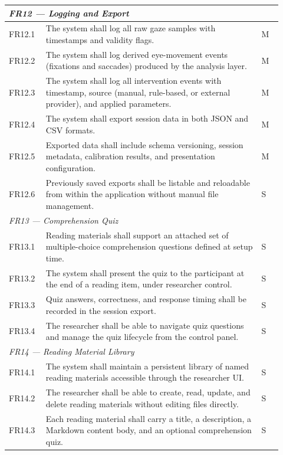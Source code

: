 \begin{longtable}{%
  p{0.12\linewidth}
  p{0.73\linewidth}
  p{0.07\linewidth}
}
\multicolumn{3}{l}{\textit{FR12 — Logging and Export}} \\
\midrule
FR12.1 & The system shall log all raw gaze samples with timestamps and
         validity flags. & M \\
FR12.2 & The system shall log derived eye-movement events (fixations and
         saccades) produced by the analysis layer. & M \\
FR12.3 & The system shall log all intervention events with timestamp,
         source (manual, rule-based, or external provider), and applied
         parameters. & M \\
FR12.4 & The system shall export session data in both JSON and CSV formats. & M \\
FR12.5 & Exported data shall include schema versioning, session metadata,
         calibration results, and presentation configuration. & M \\
FR12.6 & Previously saved exports shall be listable and reloadable from
         within the application without manual file management. & S \\
\midrule

\multicolumn{3}{l}{\textit{FR13 — Comprehension Quiz}} \\
\midrule
FR13.1 & Reading materials shall support an attached set of multiple-choice
         comprehension questions defined at setup time. & S \\
FR13.2 & The system shall present the quiz to the participant at the end of
         a reading item, under researcher control. & S \\
FR13.3 & Quiz answers, correctness, and response timing shall be recorded
         in the session export. & S \\
FR13.4 & The researcher shall be able to navigate quiz questions and manage
         the quiz lifecycle from the control panel. & S \\
\midrule

\multicolumn{3}{l}{\textit{FR14 — Reading Material Library}} \\
\midrule
FR14.1 & The system shall maintain a persistent library of named reading
         materials accessible through the researcher UI. & S \\
FR14.2 & The researcher shall be able to create, read, update, and delete
         reading materials without editing files directly. & S \\
FR14.3 & Each reading material shall carry a title, a description, a
         Markdown content body, and an optional comprehension quiz. & S \\
\midrule


\end{longtable}
